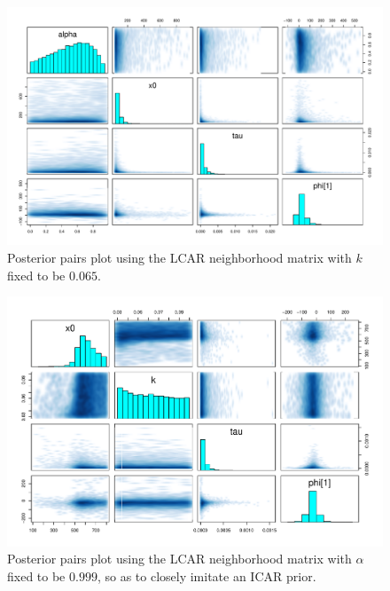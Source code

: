 \documentclass{scrartcl}
\begin{document}
\begin{figure}
  \centering
\includegraphics[width=.9\linewidth]{pairs-k-fixed}
  \caption{Posterior pairs plot using the LCAR neighborhood matrix
    with $k$ fixed to be $0.065$.}
  \label{fig:pairs-full}
\end{figure}

\begin{figure}
  \centering
\includegraphics[width=.9\linewidth]{pairs-alpha-fixed}
\caption{Posterior pairs plot using the LCAR neighborhood matrix with
  $\alpha$ fixed to be $0.999$, so as to closely imitate an ICAR
  prior.}
  \label{fig:pairs-full}
\end{figure}
\end{document}
